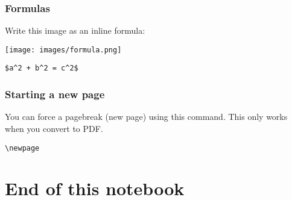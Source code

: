 \documentclass[
]{article}
\begin{document}
\hypertarget{formulas}{%
\subsubsection{Formulas}\label{formulas}}

Write this image as an inline formula:

\texttt{[image: images/formula.png]}

\begin{verbatim}
$a^2 + b^2 = c^2$
\end{verbatim}

\hypertarget{starting-a-new-page}{%
\subsubsection{Starting a new page}\label{starting-a-new-page}}

You can force a pagebreak (new page) using this command. This only works
when you convert to PDF.

\begin{verbatim}
\newpage
\end{verbatim}

\hypertarget{end-of-this-notebook}{%
\section{End of this notebook}\label{end-of-this-notebook}}
\end{document}
